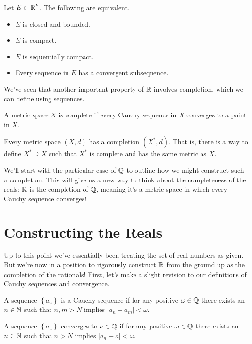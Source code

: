 \documentclass[../m131main.tex]{subfiles}
\begin{document}
\begin{theorem}
    Let $E \subset \mathbb{R}^k$.
    The following are equivalent.
    \begin{itemize}[topsep=0pt]
        \item $E$ is closed and bounded.
        \item $E$ is compact.
        \item $E$ is sequentially compact.
        \item Every sequence in $E$ has a convergent subsequence.
    \end{itemize}
\end{theorem}

We've seen that another important property of $\mathbb{R}$ involves completion, which we can define using sequences.

\begin{definition}[Complete]
    A metric space $X$ is complete if every Cauchy sequence in $X$ converges to a point in $X$.
\end{definition}

\begin{theorem}[Completion] \label{thm:completion}
    Every metric space $(X, d)$ has a completion $(X^*, d)$.
    That is, there is a way to define $X^* \supseteq X$ such that $X^*$ is complete and has the same metric as $X$.
\end{theorem}

We'll start with the particular case of $\mathbb{Q}$ to outline how we might construct such a completion.
This will give us a new way to think about the completeness of the reals: $\mathbb{R}$ is the completion of $\mathbb{Q}$, meaning it's a metric space in which every Cauchy sequence converges!

\section{Constructing the Reals}
Up to this point we've essentially been treating the set of real numbers as given.
But we're now in a position to rigorously construct $\mathbb{R}$ from the ground up as the completion of the rationals!
First, let's make a slight revision to our definitions of Cauchy sequences and convergence.

\begin{definition}
    A sequence $\left\{ a_n \right\}$ is a Cauchy sequence if for any positive $\omega \in \mathbb{Q}$ there exists an $n \in \mathbb{N}$ such that $n,m > N$ implies $|a_n - a_m| < \omega$.

    A sequence $\left\{ a_n \right\}$ converges to $a \in \mathbb{Q}$ if for any positive $\omega \in \mathbb{Q}$ there exists an $n \in \mathbb{N}$ such that $n > N$ implies $|a_n - a| < \omega$.
\end{definition}
\end{document}
